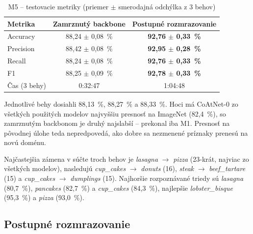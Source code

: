 \begin{table}[H]
    \centering
    \caption{M5 -- testovacie metriky (priemer $\pm$ smerodajná odchýlka z 3 behov)}
    \label{tab:m5-metrics}
    \begin{tabular}{lcc}
        \toprule
        Metrika & Zamrznutý backbone & Postupné rozmrazovanie \\
        \midrule
        Accuracy  & 88,24 $\pm$ 0,08~\% & \textbf{92,76 $\pm$ 0,33~\%} \\
        Precision & 88,42 $\pm$ 0,08~\% & \textbf{92,95 $\pm$ 0,28~\%} \\
        Recall    & 88,24 $\pm$ 0,08~\% & \textbf{92,76 $\pm$ 0,33~\%} \\
        F1        & 88,25 $\pm$ 0,09~\% & \textbf{92,78 $\pm$ 0,33~\%} \\
        Čas (3 behy) & 0:32:47 & 1:04:48 \\
        \bottomrule
    \end{tabular}
\end{table}

Jednotlivé behy dosiahli 88,13~\%, 88,27~\% a 88,33~\%. Hoci má CoAtNet-0
zo všetkých použitých modelov najvyššiu presnosť na ImageNet (82,4~\%), so
zamrznutým backbonom je druhý najslabší -- prekonal iba M1. Presnosť na
pôvodnej úlohe teda nepredpovedá, ako dobre sa nezmenené príznaky prenesú
na novú doménu.


Najčastejšia zámena v súčte troch behov je \emph{lasagna} $\rightarrow$
\emph{pizza} (23-krát, najviac zo všetkých modelov), nasledujú
\emph{cup\_cakes} $\rightarrow$ \emph{donuts} (16), \emph{steak}
$\rightarrow$ \emph{beef\_tartare} (15) a \emph{cup\_cakes} $\rightarrow$
\emph{dumplings} (15). Najhoršie rozpoznávané triedy sú \emph{lasagna}
(80,7~\%), \emph{pancakes} (82,7~\%) a \emph{cup\_cakes} (84,3~\%),
najlepšie \emph{lobster\_bisque} (95,3~\%) a \emph{pizza} (93,0~\%).

\subsection{Postupné rozmrazovanie}



